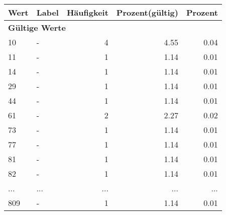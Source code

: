      \begin{longtable}{lXrrr}
     \toprule
     \textbf{Wert} & \textbf{Label} & \textbf{Häufigkeit} & \textbf{Prozent(gültig)} & \textbf{Prozent} \\
     \endhead
     \midrule
     \multicolumn{5}{l}{\textbf{Gültige Werte}}\\
        10 & \multicolumn{1}{X}{-} & %
          \num{4} &
          \num[round-mode=places,round-precision=2]{4,55} &
          \num[round-mode=places,round-precision=2]{0,04} \\
        11 & \multicolumn{1}{X}{-} & %
          \num{1} &
          \num[round-mode=places,round-precision=2]{1,14} &
          \num[round-mode=places,round-precision=2]{0,01} \\
        14 & \multicolumn{1}{X}{-} & %
          \num{1} &
          \num[round-mode=places,round-precision=2]{1,14} &
          \num[round-mode=places,round-precision=2]{0,01} \\
        29 & \multicolumn{1}{X}{-} & %
          \num{1} &
          \num[round-mode=places,round-precision=2]{1,14} &
          \num[round-mode=places,round-precision=2]{0,01} \\
        44 & \multicolumn{1}{X}{-} & %
          \num{1} &
          \num[round-mode=places,round-precision=2]{1,14} &
          \num[round-mode=places,round-precision=2]{0,01} \\
        61 & \multicolumn{1}{X}{-} & %
          \num{2} &
          \num[round-mode=places,round-precision=2]{2,27} &
          \num[round-mode=places,round-precision=2]{0,02} \\
        73 & \multicolumn{1}{X}{-} & %
          \num{1} &
          \num[round-mode=places,round-precision=2]{1,14} &
          \num[round-mode=places,round-precision=2]{0,01} \\
        77 & \multicolumn{1}{X}{-} & %
          \num{1} &
          \num[round-mode=places,round-precision=2]{1,14} &
          \num[round-mode=places,round-precision=2]{0,01} \\
        81 & \multicolumn{1}{X}{-} & %
          \num{1} &
          \num[round-mode=places,round-precision=2]{1,14} &
          \num[round-mode=places,round-precision=2]{0,01} \\
        82 & \multicolumn{1}{X}{-} & %
          \num{1} &
          \num[round-mode=places,round-precision=2]{1,14} &
          \num[round-mode=places,round-precision=2]{0,01} \\
       ... & ... & ... & ... & ... \\
        809 & \multicolumn{1}{X}{-} & %
          \num{1} &
          \num[round-mode=places,round-precision=2]{1,14} &
          \num[round-mode=places,round-precision=2]{0,01} \\


\end{longtable}
